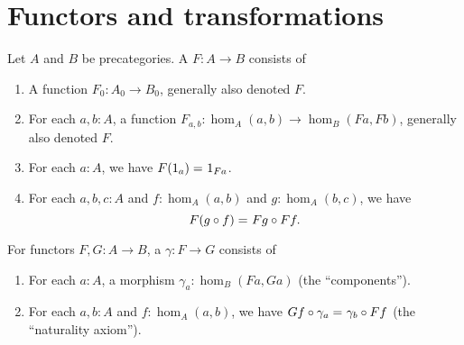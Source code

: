 \documentclass[hott-all.tex]{subfiles}
\begin{document}
\section{Functors and transformations}
\label{sec:transfors}


\begin{defn}\label{ct:functor}
  Let $A$ and $B$ be precategories.
  A 
  $F:A\to B$ consists of
  \begin{enumerate}
  \item A function $F_0:A_0\to B_0$, generally also denoted $F$.
  \item For each $a,b:A$, a function $F_{a,b}:\hom_A(a,b) \to \hom_B(Fa,Fb)$, generally also denoted $F$.
  \item For each $a:A$, we have $F(1_a) =_{} 1_{Fa}$.
  \item For each $a,b,c:A$ and $f:\hom_A(a,b)$ and $g:\hom_A(b,c)$, we have
    \[F(g\circ f) =_{} Fg\circ Ff.\]\label{ct:functor:comp}
  \end{enumerate}
\end{defn}


\begin{defn}\label{ct:nattrans}
  For functors $F,G:A\to B$, a 
  $\gamma:F\to G$ consists of
  \begin{enumerate}
  \item For each $a:A$, a morphism $\gamma_a:\hom_B(Fa,Ga)$ (the ``components'').
  \item For each $a,b:A$ and $f:\hom_A(a,b)$, we have $Gf\circ \gamma_a =_{} \gamma_b\circ Ff$ (the ``naturality axiom'').
  \end{enumerate}
\end{defn}

%
\end{document}
